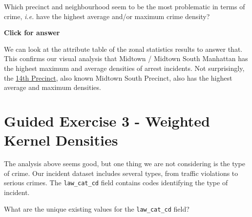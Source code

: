 \documentclass[
  letterpaper,
  DIV=11,
  numbers=noendperiod]{scrreprt}
\begin{document}
\begin{tcolorbox}[enhanced jigsaw, coltitle=black, toprule=.15mm, breakable, opacitybacktitle=0.6, left=2mm, colback=white, leftrule=.75mm, rightrule=.15mm, colbacktitle=quarto-callout-important-color!10!white, toptitle=1mm, titlerule=0mm, colframe=quarto-callout-important-color-frame, arc=.35mm, bottomtitle=1mm, opacityback=0, bottomrule=.15mm, title=\textcolor{quarto-callout-important-color}{\faExclamation}\hspace{0.5em}{Stop and Think}]

Which precinct and neighbourhood seem to be the most problematic in
terms of crime, \emph{i.e.} have the highest average and/or maximum
crime density?

\end{tcolorbox}

\begin{tcolorbox}[enhanced jigsaw, toprule=.15mm, breakable, left=2mm, colframe=quarto-callout-important-color-frame, colback=white, arc=.35mm, leftrule=.75mm, opacityback=0, rightrule=.15mm, bottomrule=.15mm]

\vspace{-3mm}\textbf{Click for answer}\vspace{3mm}

We can look at the attribute table of the zonal statistics results to
answer that. This confirms our visual analysis that Midtown / Midtown
South Manhattan has the highest maximum and average densities of arrest
incidents. Not surprisingly, the
\href{https://www.nyc.gov/site/nypd/bureaus/patrol/precincts/midtown-south-precinct.page}{14th
Precinct}, also known Midtown South Precinct, also has the highest
average and maximum densities.

\end{tcolorbox}

\section{Guided Exercise 3 - Weighted Kernel
Densities}\label{guided-exercise-3---weighted-kernel-densities}

The analysis above seems good, but one thing we are not considering is
the type of crime. Our incident dataset includes several types, from
traffic violations to serious crimes. The \texttt{law\_cat\_cd} field
contains codes identifying the type of incident.

\begin{tcolorbox}[enhanced jigsaw, coltitle=black, toprule=.15mm, breakable, opacitybacktitle=0.6, left=2mm, colback=white, leftrule=.75mm, rightrule=.15mm, colbacktitle=quarto-callout-important-color!10!white, toptitle=1mm, titlerule=0mm, colframe=quarto-callout-important-color-frame, arc=.35mm, bottomtitle=1mm, opacityback=0, bottomrule=.15mm, title=\textcolor{quarto-callout-important-color}{\faExclamation}\hspace{0.5em}{Stop and Think}]

What are the unique existing values for the \texttt{law\_cat\_cd} field?

\end{tcolorbox}
\end{document}
